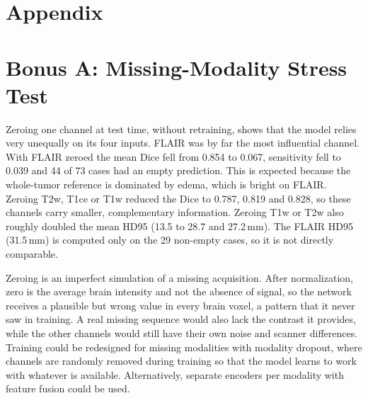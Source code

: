 \documentclass[10pt,a4paper]{article}
\begin{document}
\clearpage
\appendix
\section*{Appendix}
\section*{Bonus A: Missing-Modality Stress Test}
\begin{table}[H]
\centering
\caption{Test results with one channel zeroed at test time, without retraining (after postprocessing, 73 cases).}
\small
{}
\end{table}

Zeroing one channel at test time, without retraining, shows that the model relies very unequally on its four inputs. FLAIR was by far the most influential channel. With FLAIR zeroed the mean Dice fell from 0.854 to 0.067, sensitivity fell to 0.039 and 44 of 73 cases had an empty prediction. This is expected because the whole-tumor reference is dominated by edema, which is bright on FLAIR. Zeroing T2w, T1ce or T1w reduced the Dice to 0.787, 0.819 and 0.828, so these channels carry smaller, complementary information. Zeroing T1w or T2w also roughly doubled the mean HD95 (13.5 to 28.7 and 27.2\,mm). The FLAIR HD95 (31.5\,mm) is computed only on the 29 non-empty cases, so it is not directly comparable.

Zeroing is an imperfect simulation of a missing acquisition. After normalization, zero is the average brain intensity and not the absence of signal, so the network receives a plausible but wrong value in every brain voxel, a pattern that it never saw in training. A real missing sequence would also lack the contrast it provides, while the other channels would still have their own noise and scanner differences. Training could be redesigned for missing modalities with modality dropout, where channels are randomly removed during training so that the model learns to work with whatever is available. Alternatively, separate encoders per modality with feature fusion could be used.
\end{document}

